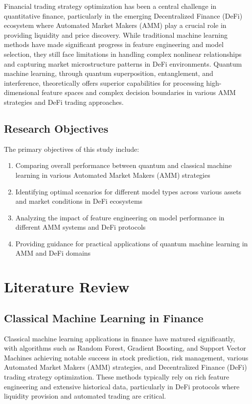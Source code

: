 \documentclass[12pt,a4paper]{article}
\begin{document}
Financial trading strategy optimization has been a central challenge in quantitative finance, particularly in the emerging Decentralized Finance (DeFi) ecosystem where Automated Market Makers (AMM) play a crucial role in providing liquidity and price discovery. While traditional machine learning methods have made significant progress in feature engineering and model selection, they still face limitations in handling complex nonlinear relationships and capturing market microstructure patterns in DeFi environments. Quantum machine learning, through quantum superposition, entanglement, and interference, theoretically offers superior capabilities for processing high-dimensional feature spaces and complex decision boundaries in various AMM strategies and DeFi trading approaches.

\subsection{Research Objectives}

The primary objectives of this study include:
\begin{enumerate}
    \item Comparing overall performance between quantum and classical machine learning in various Automated Market Makers (AMM) strategies
    \item Identifying optimal scenarios for different model types across various assets and market conditions in DeFi ecosystems
    \item Analyzing the impact of feature engineering on model performance in different AMM systems and DeFi protocols
    \item Providing guidance for practical applications of quantum machine learning in AMM and DeFi domains
\end{enumerate}

\section{Literature Review}

\subsection{Classical Machine Learning in Finance}

Classical machine learning applications in finance have matured significantly, with algorithms such as Random Forest, Gradient Boosting, and Support Vector Machines achieving notable success in stock prediction, risk management, various Automated Market Makers (AMM) strategies, and Decentralized Finance (DeFi) trading strategy optimization. These methods typically rely on rich feature engineering and extensive historical data, particularly in DeFi protocols where liquidity provision and automated trading are critical.
\end{document}
